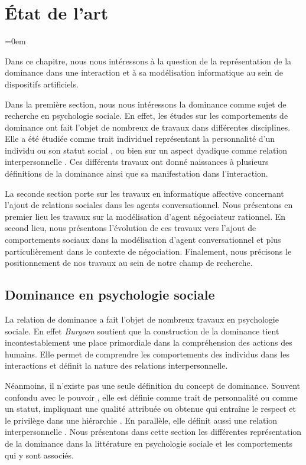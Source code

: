 \chapter{État de l'art }
\label{chap:etat}

\begingroup
\parindent=0em
 \localtableofcontents 
\clearpage
\endgroup


Dans ce chapitre, nous nous intéressons à la question de la représentation de la dominance dans une interaction et à sa modélisation informatique au sein de dispositifs artificiels.

Dans la première section, nous nous intéressons la dominance comme sujet de recherche en psychologie sociale. En effet, les études sur les comportements de dominance ont fait l'objet de nombreux de travaux dans différentes disciplines. Elle a été étudiée comme trait individuel représentant la personnalité d'un individu \cite{emmons1991personal} ou son statut social \cite{liska1990dominance}, ou bien sur un aspect dyadique comme relation interpersonnelle \cite{burgoon2006nonverbal}. Ces différents travaux ont donné naissances à plusieurs définitions de la dominance ainsi que sa manifestation dans l'interaction.

La seconde section porte sur les travaux en informatique affective concernant l'ajout de relations sociales dans les agents conversationnel. Nous présentons en premier lieu les travaux sur la modélisation d'agent négociateur rationnel. En second lieu, nous présentons l'évolution de ces travaux vers l'ajout de comportements sociaux dans la modélisation d'agent conversationnel et plus particulièrement dans le contexte de négociation. Finalement, nous précisons le positionnement de nos travaux au sein de notre champ de recherche.

\section{Dominance en psychologie sociale}
	La relation de dominance a fait l'objet de nombreux travaux en psychologie sociale. En effet \emph{Burgoon} soutient que la construction de la dominance tient incontestablement une place primordiale dans la compréhension des actions des humains\cite{burgoon1995interpersonal}. Elle permet de comprendre les comportements des individus dans les interactions et définit la nature des relations interpersonnelle. 
	
	Néanmoins, il n'existe pas une seule définition du concept de dominance. Souvent confondu avec le pouvoir  \cite{burgoon2000interactionist,dunbar2005perceptions}, elle est définie comme trait de personnalité ou comme un statut, impliquant une qualité attribuée ou obtenue qui entraîne le respect et le privilège dans une hiérarchie \cite{hall2005nonverbal}. En parallèle, elle définit aussi une relation interpersonnelle \cite{burgoon2006nonverbal,burgoon1998nature}. Nous présentons dans cette section les différentes représentation de la dominance dans la littérature en psychologie sociale et les comportements qui y sont associés.  
	
